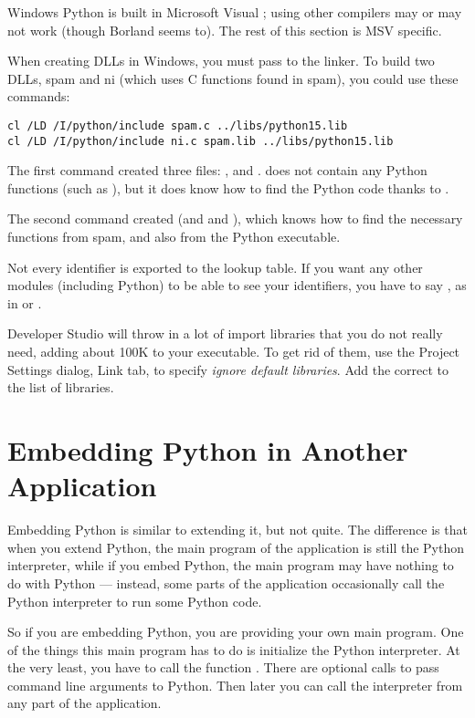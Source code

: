 \documentclass{manual}
\begin{document}
Windows Python is built in Microsoft Visual \Cpp{}; using other
compilers may or may not work (though Borland seems to).  The rest of
this section is MSV\Cpp{} specific.

When creating DLLs in Windows, you must pass  to
the linker.  To build two DLLs, spam and ni (which uses C functions
found in spam), you could use these commands:

\begin{verbatim}
cl /LD /I/python/include spam.c ../libs/python15.lib
cl /LD /I/python/include ni.c spam.lib ../libs/python15.lib
\end{verbatim}

The first command created three files: ,
 and .   does not contain
any Python functions (such as ), but it
does know how to find the Python code thanks to .

The second command created  (and  and
), which knows how to find the necessary functions from
spam, and also from the Python executable.

Not every identifier is exported to the lookup table.  If you want any
other modules (including Python) to be able to see your identifiers,
you have to say , as in  or .

Developer Studio will throw in a lot of import libraries that you do
not really need, adding about 100K to your executable.  To get rid of
them, use the Project Settings dialog, Link tab, to specify
\emph{ignore default libraries}.  Add the correct
 to the list of libraries.


\chapter{Embedding Python in Another Application
         \label{embedding}}

Embedding Python is similar to extending it, but not quite.  The
difference is that when you extend Python, the main program of the
application is still the Python interpreter, while if you embed
Python, the main program may have nothing to do with Python ---
instead, some parts of the application occasionally call the Python
interpreter to run some Python code.

So if you are embedding Python, you are providing your own main
program.  One of the things this main program has to do is initialize
the Python interpreter.  At the very least, you have to call the
function .  There are optional calls to
pass command line arguments to Python.  Then later you can call the
interpreter from any part of the application.
\end{document}
